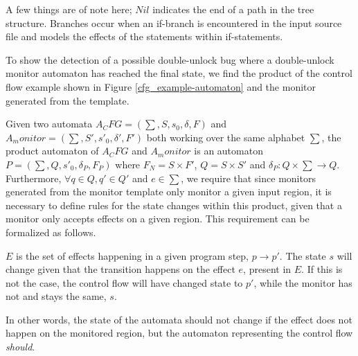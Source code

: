 \noindent A few things are of note here; $Nil$ indicates the end of a path in the tree structure. Branches occur when an if-branch is encountered in the input source file and models the effects of the statements within if-statements.

\newpar To show the detection of a possible double-unlock bug where a double-unlock monitor automaton has reached the final state, we find the product of the control flow example shown in Figure \ref{cfg_example-automaton} and the monitor generated from the template. 

\newpar Given two automata $A_CFG = (\sum, S, s_0, \delta, F)$ and $A_monitor = (\sum, S', s'_0, \delta', F')$ both working over the same alphabet $\sum$, the product automaton of $A_CFG$ and $A_monitor$ is an automaton $P = (\sum, Q, s'_0, \delta_P, F_P)$ where $F_N = S \times F'$, $Q = S \times S'$ and $\delta_P : Q \times \sum \rightarrow Q$. Furthermore, $\forall q \in Q , q' \in Q'$ and $e \in \sum$, we require that since monitors generated from the monitor template only monitor a given input region, it is necessary to define rules for the state changes within this product, given that a monitor only accepts effects on a given region. This requirement can be formalized as follows.

\begin{center}
    \begin{prooftree}
    \end{prooftree}
    \hspace{2cm}
    \begin{prooftree}
    \end{prooftree}
\end{center}
    
\newpar $E$ is the set of effects happening in a given program step, $p \rightarrow p'$. The state $s$ will change given that the transition happens on the effect $e$, present in $E$. If this is not the case, the control flow will have changed state to $p'$, while the monitor has not and stays the same, $s$. 

\newpar In other words, the state of the automata should not change if the effect does not happen on the monitored region, but the automaton representing the control flow \textit{should}. 

